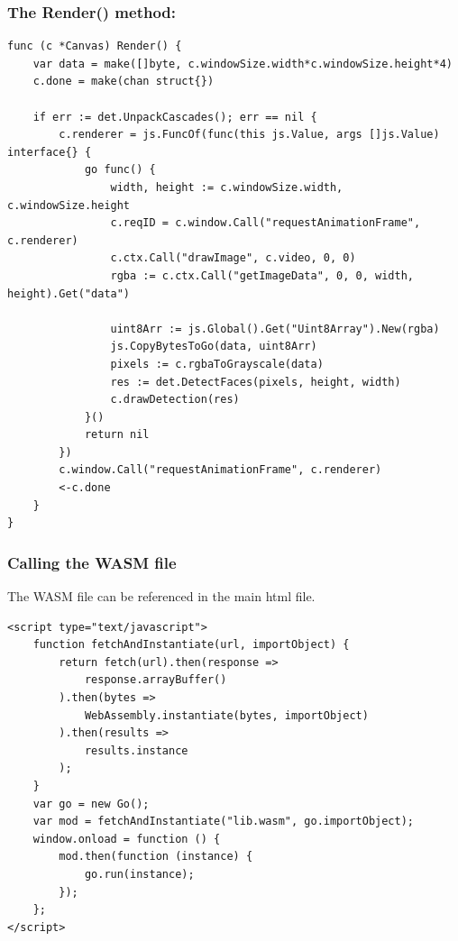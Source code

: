 \documentclass[9pt]{beamer}
\begin{document}
\begin{frame}[fragile]
\frametitle{The Render() method:}



\begin{verbatim}
func (c *Canvas) Render() {
    var data = make([]byte, c.windowSize.width*c.windowSize.height*4)
    c.done = make(chan struct{})

    if err := det.UnpackCascades(); err == nil {
        c.renderer = js.FuncOf(func(this js.Value, args []js.Value) interface{} {
            go func() {
                width, height := c.windowSize.width, c.windowSize.height
                c.reqID = c.window.Call("requestAnimationFrame", c.renderer)
                c.ctx.Call("drawImage", c.video, 0, 0)
                rgba := c.ctx.Call("getImageData", 0, 0, width, height).Get("data")

                uint8Arr := js.Global().Get("Uint8Array").New(rgba)
                js.CopyBytesToGo(data, uint8Arr)
                pixels := c.rgbaToGrayscale(data)
                res := det.DetectFaces(pixels, height, width)
                c.drawDetection(res)
            }()
            return nil
        })
        c.window.Call("requestAnimationFrame", c.renderer)
        <-c.done
    }
}

\end{verbatim}



\end{frame}

\begin{frame}[fragile]
\frametitle{Calling the WASM file}


The WASM file can be referenced in the main html file.



\begin{verbatim}
<script type="text/javascript">
    function fetchAndInstantiate(url, importObject) {
        return fetch(url).then(response =>
            response.arrayBuffer()
        ).then(bytes =>
            WebAssembly.instantiate(bytes, importObject)
        ).then(results =>
            results.instance
        );
    }
    var go = new Go();
    var mod = fetchAndInstantiate("lib.wasm", go.importObject);
    window.onload = function () {
        mod.then(function (instance) {
            go.run(instance);
        });
    };
</script>

\end{verbatim}



\end{frame}
\end{document}
